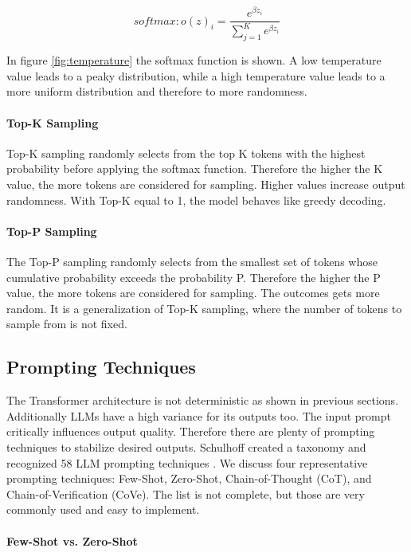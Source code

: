 $$softmax: o(z)_i = \frac{e^{\beta z_i}}{\sum_{j=1}^K e^{\beta z_i}}$$

In figure \ref{fig:temperature} the softmax function is shown. A low temperature value leads to a peaky distribution, while a high temperature value leads to a more uniform distribution and therefore to more randomness.


\paragraph{Top-K Sampling}
Top-K sampling \cite{Fan.13.05.2018} randomly selects from the top K tokens with the highest probability before applying the softmax function. Therefore the higher the K value, the more tokens are considered for sampling. Higher values increase output randomness. With Top-K equal to 1, the model behaves like greedy decoding.

\paragraph{Top-P Sampling}
The Top-P sampling \cite{Holtzman.22.04.2019} randomly selects from the smallest set of tokens whose cumulative probability exceeds the probability P. Therefore the higher the P value, the more tokens are considered for sampling. The outcomes gets more random. It is a generalization of Top-K sampling, where the number of tokens to sample from is not fixed.

\subsection{Prompting Techniques}
The Transformer architecture is not deterministic as shown in previous sections. Additionally LLMs have a high variance for its outputs too. The input prompt critically influences output quality. Therefore there are plenty of prompting techniques to stabilize desired outputs. Schulhoff created a taxonomy and recognized 58 LLM prompting techniques \cite{Schulhoff.06.06.2024}. We discuss four representative prompting techniques: Few-Shot, Zero-Shot, Chain-of-Thought (CoT), and Chain-of-Verification (CoVe). The list is not complete, but those are very commonly used and easy to implement.

\paragraph{Few-Shot vs. Zero-Shot}

